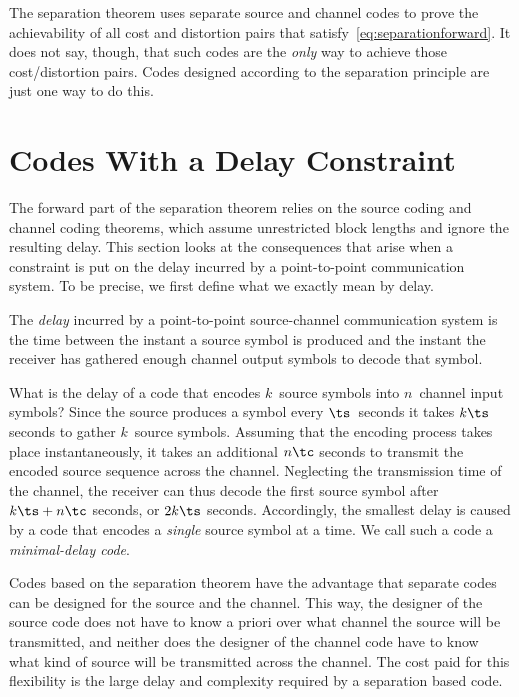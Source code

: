 The separation theorem uses separate source and channel codes to prove the
achievability of all cost and distortion pairs that
satisfy~\eqref{eq:separationforward}. It does not say, though, that such codes
are the \emph{only} way to achieve those cost/distortion pairs. Codes designed
according to the separation principle are just one way to do this.


\section{Codes With a Delay Constraint}

The forward part of the separation theorem relies on the source coding
and channel coding theorems, which assume unrestricted block lengths and
ignore the resulting delay. This section looks at the consequences that arise
when a constraint is put on the delay incurred by a point-to-point communication
system. To be precise, we first define what we exactly mean by delay.

\begin{definition}
  \label{def:delay}
  The \emph{delay} incurred by a point-to-point source-channel communication
  system is the time between the instant a source symbol is produced and the
  instant the receiver has gathered enough channel output symbols to decode that
  symbol. 
\end{definition}

What is the delay of a code that encodes $k$~source symbols into $n$~channel
input symbols? Since the source produces a symbol every $\ts$~seconds it takes
$k\ts$ seconds to gather $k$~source symbols. Assuming that the encoding process
takes place instantaneously, it takes an additional $n\tc$ seconds to transmit
the encoded source sequence across the channel. Neglecting the transmission time
of the channel, the receiver can thus decode the first source symbol after $k\ts
+ n \tc$ seconds, or $2k\ts$ seconds. Accordingly, the smallest delay is caused
by a code that encodes a \emph{single} source symbol at a time. We call such a
code a \emph{minimal-delay code}.

Codes based on the separation theorem have the advantage that separate codes can
be designed for the source and the channel. This way, the designer of the source
code does not have to know a priori over what channel the source will be
transmitted, and neither does the designer of the channel code have to know what
kind of source will be transmitted across the channel. The cost paid for this
flexibility is the large delay and complexity required by a separation based
code. 

